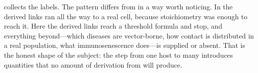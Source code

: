  collects the labels. The pattern differs from
 in a way worth noticing. In
 the derived links ran all the way to a real cell,
because stoichiometry was enough to reach it. Here the derived links reach a
threshold formula and stop, and everything beyond---which diseases are
vector-borne, how contact is distributed in a real population, what
immunosenescence does---is supplied or absent. That is the honest shape of
the subject: the step from one host to many introduces quantities that no
amount of derivation from  will produce.
